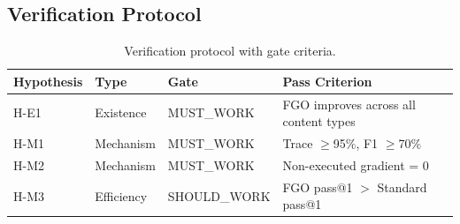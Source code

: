 \subsection{Verification Protocol}

\begin{table}[h]
\centering
\caption{Verification protocol with gate criteria.}
\label{tab:verification}
\begin{tabular}{@{}llll@{}}
\toprule
Hypothesis & Type & Gate & Pass Criterion \\
\midrule
H-E1 & Existence & MUST\_WORK & FGO improves across all content types \\
H-M1 & Mechanism & MUST\_WORK & Trace $\geq$95\%, F1 $\geq$70\% \\
H-M2 & Mechanism & MUST\_WORK & Non-executed gradient = 0 \\
H-M3 & Efficiency & SHOULD\_WORK & FGO pass@1 $>$ Standard pass@1 \\
\bottomrule
\end{tabular}
\end{table}

